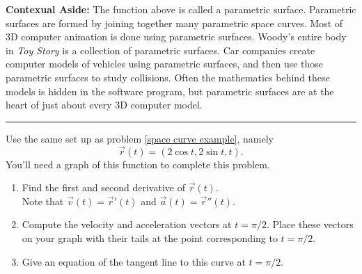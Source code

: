 \textbf{Contexual Aside:} The function above is called a parametric surface.  Parametric surfaces are formed by joining together many parametric space curves. Most of 3D computer animation is done using parametric surfaces. Woody's entire body in {\it Toy Story} is a collection of parametric surfaces. Car companies create computer models of vehicles using parametric surfaces, and then use those parametric surfaces to study collisions. Often the mathematics behind these models is hidden in the software program, but parametric surfaces are at the heart of just about every 3D computer model.

\vskip0.1in
\hrule
\vskip0.1in

\begin{problem}
%
%
 Use the same set up as problem \ref{space curve example}, namely $$\vec r(t)=(2\cos t, 2\sin t, t).$$  You'll need a graph of this function to complete this problem.
 \begin{enumerate}
  \item Find the first and second derivative of $\vec r(t)$. \\
	Note that $\vec{v}(t) = \vec{r}'(t)$ and $\vec{a}(t)=\vec{r}''(t)$.
  \item Compute the velocity and acceleration vectors at $t=\pi/2$. Place these vectors on your graph with their tails at the point corresponding to $t=\pi/2$.
  \item Give an equation of the tangent line to this curve at $t=\pi/2$.
 \end{enumerate}
\end{problem}


